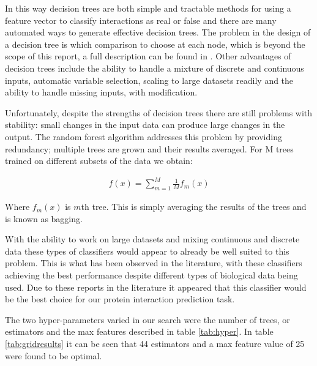 In this way decision trees are both simple and tractable methods for using a feature vector to classify interactions as real or false and there are many automated ways to generate effective decision trees.
The problem in the design of a decision tree is which comparison to choose at each node, which is beyond the scope of this report, a full description can be found in \textcite[544]{murphy_machine_2012}.
Other advantages of decision trees include the ability to handle a mixture of discrete and continuous inputs, automatic variable selection, scaling to large datasets readily and the ability to handle missing inputs, with modification.


Unfortunately, despite the strengths of decision trees there are still problems with stability: small changes in the input data can produce large changes in the output\autocite[550]{murphy_machine_2012}.
The random forest algorithm addresses this problem by providing redundancy; multiple trees are grown and their results averaged.
For M trees trained on different subsets of the data\autocite[551]{murphy_machine_2012} we obtain:

\begin{align}
    f(x) = \sum_{m=1}^{M} \frac{1}{M} f_{m}(x)
\end{align}

Where $f_{m}(x)$ is $m$th tree. This is simply averaging the results of the trees and is known as bagging.

With the ability to work on large datasets and mixing continuous and discrete data these types of classifiers would appear to already be well suited to this problem.
This is what has been observed in the literature, with these classifiers achieving the best performance despite different types of biological data being used\autocites{qi_evaluation_2006,rodgers-melnick_predicting_2013}.
Due to these reports in the literature it appeared that this classifier would be the best choice for our protein interaction prediction task.

The two hyper-parameters varied in our search were the number of trees, or estimators and the max features described in table \ref{tab:hyper}.
In table \ref{tab:gridresults} it can be seen that 44 estimators and a max feature value of 25 were found to be optimal.

